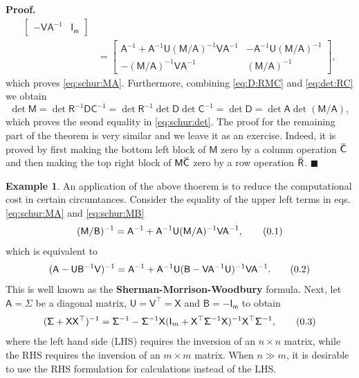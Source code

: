 \documentclass[10pt]{article}
\theoremstyle{definition}
\newtheorem{exmp}{Example}[section]
\newenvironment{prf}{\noindent\textbf{Proof.}}{\hfill$\blacksquare$}
\newcommand\eqnum{\addtocounter{equation}{1}\tag{\arabic{section}.\arabic{equation}}}
\newcommand{\overbar}[1]{\mkern 1.5mu\overline{\mkern-1.5mu#1\mkern-1.5mu}\mkern 1.5mu}
\begin{document}
\begin{prf}
\begin{align*}
\begin{bmatrix}
-\mathsf{V}\mathsf{A}^{-1} & \mathsf{I_m}
\end{bmatrix} \\ &=
\begin{bmatrix}
\mathsf{A}^{-1} + \mathsf{A}^{-1}\mathsf{U}(\mathsf{M}/\mathsf{A})^{-1}\mathsf{V}\mathsf{A}^{-1} & 
-\mathsf{A}^{-1}\mathsf{U}(\mathsf{M}/\mathsf{A})^{-1} \\
-(\mathsf{M}/\mathsf{A})^{-1}\mathsf{V}\mathsf{A}^{-1} & (\mathsf{M}/\mathsf{A})^{-1}
\end{bmatrix},
\end{align*}
which proves \cref{eq:schur:MA}. Furthermore, combining \cref{eq:D:RMC} and \cref{eq:det:RC} we obtain
\begin{equation*}
\det\mathsf{M} = \det\mathsf{R}^{-1}\mathsf{D}\mathsf{C}^{-1} = \det\mathsf{R}^{-1} \det\mathsf{D} \det\mathsf{C}^{-1}
= \det\mathsf{D} = \det\mathsf{A}\det(\mathsf{M}/\mathsf{A}),
\end{equation*}
which proves the seond equality in \cref{eq:schur:det}. The proof for the remaining part of the theorem is very similar and we leave it as an exercise. Indeed, it is proved by first making the bottom left block of $\mathsf{M}$ zero by a column operation $\overbar{\mathsf{C}}$ and then making the top right block of $\mathsf{M}\overbar{\mathsf{C}}$ zero by a row operation $\overbar{\mathsf{R}}$.
\end{prf}
\begin{exmp}
An application of the above thoerem is to reduce the computational cost in certain circumtances. Consider the equality of the upper left terms in eqs. \eqref{eq:schur:MA} and \eqref{eq:schur:MB}
\begin{equation*}
(\mathsf{M}/\mathsf{B})^{-1} = \mathsf{A}^{-1} + \mathsf{A}^{-1}\mathsf{U}(\mathsf{M}/\mathsf{A})^{-1}\mathsf{V}\mathsf{A}^{-1},
\eqnum
\end{equation*}
which is equivalent to
\begin{equation*}
(\mathsf{A} - \mathsf{U}\mathsf{B}^{-1}\mathsf{V})^{-1} = \mathsf{A}^{-1} + \mathsf{A}^{-1}\mathsf{U}(\mathsf{B}-\mathsf{V}\mathsf{A}^{-1}\mathsf{U})^{-1}\mathsf{V}\mathsf{A}^{-1}.
\eqnum
\label{eq:SMW:formula}
\end{equation*}
This is well known as the \textbf{Sherman-Morrison-Woodbury} formula. Next, let $\mathsf{A} = \mathsf{\Sigma}$ be a diagonal matrix, $\mathsf{U} = \mathsf{V}^{\top} = \mathsf{X}$ and $\mathsf{B} = -\mathsf{I_m}$ to obtain
\begin{equation*}
(\mathsf{\Sigma} + \mathsf{X}\mathsf{X}^{\top})^{-1} =
\mathsf{\Sigma}^{-1} - \mathsf{\Sigma}^{-1}\mathsf{X}(\mathsf{I}_m+\mathsf{X}^{\top}\mathsf{\Sigma}^{-1}\mathsf{X})^{-1}\mathsf{X}^{\top}\mathsf{\Sigma}^{-1},
\eqnum
\end{equation*}
where the left hand side (LHS) requires the inversion of an $n\times n$ matrix, while the RHS requires the inversion of an $m\times m$ matrix. When $n \gg m$, it is desirable to use the RHS formulation for calculations instead of the LHS. 
\end{exmp}
\end{document}
